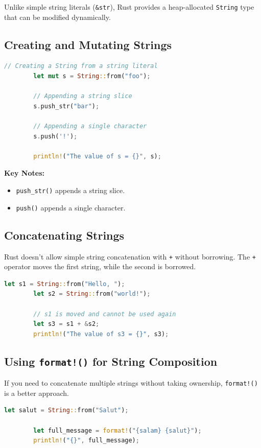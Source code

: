 \documentclass[a4paper,12pt]{report}
\begin{document}
	Unlike simple string literals (\texttt{\&str}), Rust provides a heap-allocated \texttt{String} type that can be modified dynamically.
	
	\subsection*{Creating and Mutating Strings}
	
	\begin{lstlisting}[language=Rust]
		// Creating a String from a string literal
		let mut s = String::from("foo");
		
		// Appending a string slice
		s.push_str("bar");
		
		// Appending a single character
		s.push('!');
		
		println!("The value of s = {}", s);
	\end{lstlisting}
	
	\noindent\textbf{Key Notes:}
	\begin{itemize}
		\item \texttt{push\_str()} appends a string slice.
		\item \texttt{push()} appends a single character.
	\end{itemize}
	
	\subsection*{Concatenating Strings}
	
	Rust doesn’t allow simple string concatenation with \texttt{+} without borrowing. The \texttt{+} operator moves the first string, while the second is borrowed.
	
	\begin{lstlisting}[language=Rust]
		let s1 = String::from("Hello, ");
		let s2 = String::from("world!");
		
		// s1 is moved and cannot be used again
		let s3 = s1 + &s2;  
		println!("The value of s3 = {}", s3);
	\end{lstlisting}
	
	\subsection*{Using \texttt{format!()} for String Composition}
	
	If you need to concatenate multiple strings without taking ownership, \texttt{format!()} is a better approach.
	
	\begin{lstlisting}[language=Rust]
		let salut = String::from("Salut");
		
		let full_message = format!("{salam} {salut}");
		println!("{}", full_message);
	\end{lstlisting}
	
\end{document}
